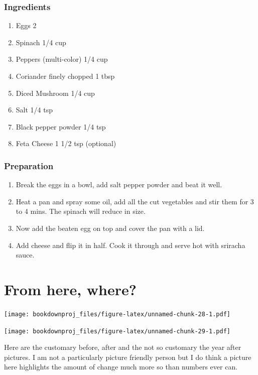 \documentclass[
  oneside]{book}
\begin{document}
\hypertarget{ingredients-7}{%
\subsection{Ingredients}\label{ingredients-7}}

\begin{enumerate}
\def\labelenumi{\arabic{enumi}.}
\item
  Eggs 2
\item
  Spinach 1/4 cup
\item
  Peppers (multi-color) 1/4 cup
\item
  Coriander finely chopped 1 tbsp
\item
  Diced Mushroom 1/4 cup
\item
  Salt 1/4 tsp
\item
  Black pepper powder 1/4 tsp
\item
  Feta Cheese 1 1/2 tsp (optional)
\end{enumerate}

\hypertarget{preparation-7}{%
\subsection{Preparation}\label{preparation-7}}

\begin{enumerate}
\def\labelenumi{\arabic{enumi}.}
\item
  Break the eggs in a bowl, add salt pepper powder and beat it well.
\item
  Heat a pan and spray some oil, add all the cut vegetables and stir them for 3 to 4 mins. The spinach will reduce in size.
\item
  Now add the beaten egg on top and cover the pan with a lid.
\item
  Add cheese and flip it in half. Cook it through and serve hot with sriracha sauce.
\end{enumerate}

\hypertarget{from-here-where}{%
\chapter{From here, where?}\label{from-here-where}}

\texttt{[image: bookdownproj\_files/figure-latex/unnamed-chunk-28-1.pdf]}

\texttt{[image: bookdownproj\_files/figure-latex/unnamed-chunk-29-1.pdf]}

Here are the customary before, after and the not so customary the year after pictures. I am not a particularly picture friendly person but I do think a picture here highlights the amount of change much more so than numbers ever can.
\end{document}
